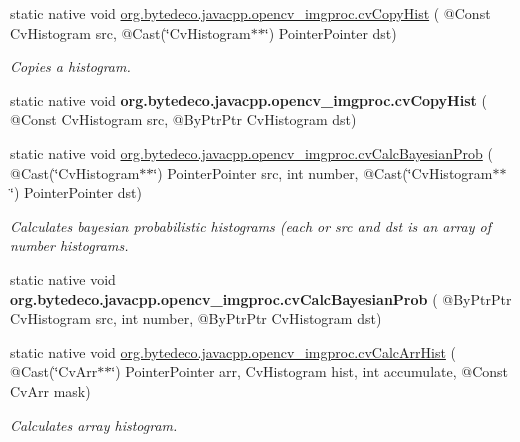 \begin{DoxyCompactItemize}
\item 
static native void \hyperlink{group__imgproc__c_ga8d6e92f294d7853bc6a9435443b56c5d}{org.\+bytedeco.\+javacpp.\+opencv\+\_\+imgproc.\+cv\+Copy\+Hist} ( @Const Cv\+Histogram src, @Cast(\char`\"{}Cv\+Histogram$\ast$$\ast$\char`\"{}) Pointer\+Pointer dst)
\begin{DoxyCompactList}\small\item\em Copies a histogram. \end{DoxyCompactList}\item 
\mbox{\label{group__imgproc__c_ga149e42a56c55adad9b552ba0d17b8aa7}} 
static native void {\bfseries org.\+bytedeco.\+javacpp.\+opencv\+\_\+imgproc.\+cv\+Copy\+Hist} ( @Const Cv\+Histogram src, @By\+Ptr\+Ptr Cv\+Histogram dst)
\item 
\mbox{\label{group__imgproc__c_ga2c80ef0ae6c6bdbe45649905b8c8e462}} 
static native void \hyperlink{group__imgproc__c_ga2c80ef0ae6c6bdbe45649905b8c8e462}{org.\+bytedeco.\+javacpp.\+opencv\+\_\+imgproc.\+cv\+Calc\+Bayesian\+Prob} ( @Cast(\char`\"{}Cv\+Histogram$\ast$$\ast$\char`\"{}) Pointer\+Pointer src, int number, @Cast(\char`\"{}Cv\+Histogram$\ast$$\ast$\char`\"{}) Pointer\+Pointer dst)
\begin{DoxyCompactList}\small\item\em Calculates bayesian probabilistic histograms (each or src and dst is an array of {\itshape number} histograms. \end{DoxyCompactList}\item 
\mbox{\label{group__imgproc__c_gab0b23a08c44f14cec9bd1d4f48c71bc8}} 
static native void {\bfseries org.\+bytedeco.\+javacpp.\+opencv\+\_\+imgproc.\+cv\+Calc\+Bayesian\+Prob} ( @By\+Ptr\+Ptr Cv\+Histogram src, int number, @By\+Ptr\+Ptr Cv\+Histogram dst)
\item 
static native void \hyperlink{group__imgproc__c_gabbad99d1facb93d0701c7476e407a2f5}{org.\+bytedeco.\+javacpp.\+opencv\+\_\+imgproc.\+cv\+Calc\+Arr\+Hist} ( @Cast(\char`\"{}Cv\+Arr$\ast$$\ast$\char`\"{}) Pointer\+Pointer arr, Cv\+Histogram hist, int accumulate, @Const Cv\+Arr mask)
\begin{DoxyCompactList}\small\item\em Calculates array histogram. \end{DoxyCompactList}\item 
\mbox{\label{group__imgproc__c_ga1b0a676395ba28ecd250180624841caf}} 

\end{DoxyCompactItemize}

